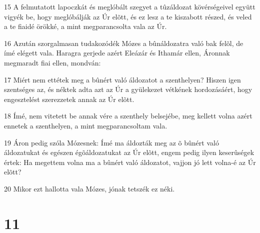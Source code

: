 \par 15 A felmutatott lapoczkát és meglóbált szegyet a tûzáldozat kövérségeivel együtt vigyék be, hogy meglóbálják az Úr elõtt, és ez lesz a te kiszabott részed, és veled a te fiaidé örökké, a mint megparancsolta vala az Úr.
\par 16 Azután szorgalmasan tudakozódék Mózes a bûnáldozatra való bak felõl, de ímé elégett vala. Haragra gerjede azért Eleázár és Ithamár ellen, Áronnak megmaradt fiai ellen, mondván:
\par 17 Miért nem ettétek meg a bûnért való áldozatot a szenthelyen? Hiszen igen szentséges az, és néktek adta azt az Úr a gyülekezet vétkének hordozásáért, hogy engesztelést szerezzetek annak az Úr elõtt.
\par 18 Ímé, nem vitetett be annak vére a szenthely belsejébe, meg kellett volna azért ennetek a szenthelyen, a mint megparancsoltam vala.
\par 19 Áron pedig szóla Mózesnek: Ímé ma áldozták meg az õ bûnért való áldozatukat és egészen égõáldozatukat az Úr elõtt, engem pedig ilyen keserûségek értek: Ha megettem volna ma a bûnért való áldozatot, vajjon jó lett volna-é az Úr elõtt?
\par 20 Mikor ezt hallotta vala Mózes, jónak tetszék ez néki.

\chapter{11}

